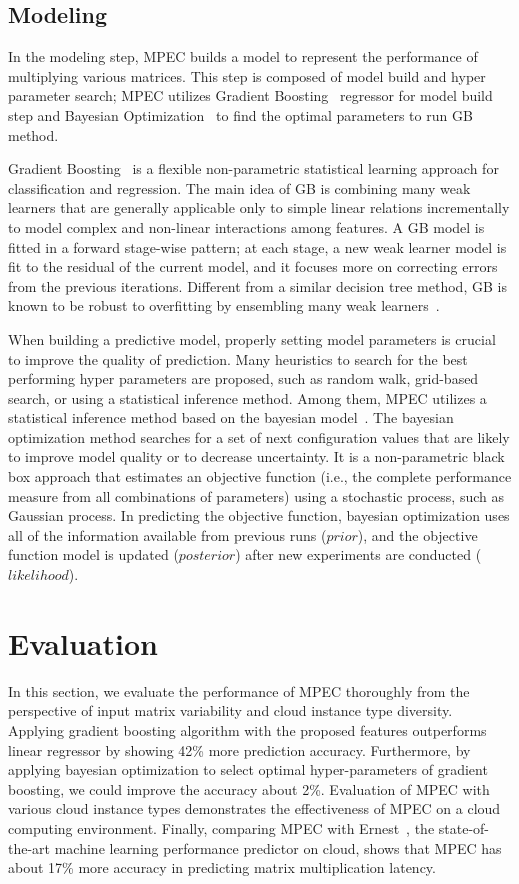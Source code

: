 \documentclass[10pt, conference, compsocconf]{IEEEtran}
\begin{document}
\subsection{Modeling}\label{sec:modeling}
In the modeling step, MPEC builds a model to represent the performance of multiplying various matrices. This step is composed of model build and hyper parameter search; MPEC utilizes Gradient Boosting~\cite{gradient-boosting} regressor for model build step and Bayesian Optimization~\cite{bayesian-optimization} to find the optimal parameters to run GB method.

Gradient Boosting~\cite{gradient-boosting} is a flexible non-parametric statistical learning approach for classification and regression. The main idea of GB is combining many weak learners that are generally applicable only to simple linear relations incrementally to model complex and non-linear interactions among features. A GB model is fitted in a forward stage-wise pattern; at each stage, a new weak learner model is fit to the residual of the current model, and it focuses more on correcting errors from the previous iterations. Different from a similar decision tree method, GB is known to be robust to overfitting by ensembling many weak learners~\cite{random-forest}.

When building a predictive model, properly setting model parameters is crucial to improve the quality of prediction. Many heuristics to search for the best performing hyper parameters are proposed, such as random walk, grid-based search, or using a statistical inference method. Among them, MPEC utilizes a statistical inference method based on the bayesian model~\cite{bayesian-optimization}. The bayesian optimization method searches for a set of next configuration values that are likely to improve model quality or to decrease uncertainty. It is a non-parametric black box approach that estimates an objective function (i.e., the complete performance measure from all combinations of parameters) using a stochastic process, such as Gaussian process. In predicting the objective function, bayesian optimization uses all of the information available from previous runs ($prior$), and the objective function model is updated ($posterior$) after new experiments are conducted ($likelihood$). 

\section{Evaluation}{\label{sec:eval}}
In this section, we evaluate the performance of MPEC thoroughly from the perspective of input matrix variability and cloud instance type diversity. Applying gradient boosting algorithm with the proposed features outperforms linear regressor by showing 42\% more prediction accuracy. Furthermore, by applying bayesian optimization to select optimal hyper-parameters of gradient boosting, we could improve the accuracy about 2\%. Evaluation of MPEC with various cloud instance types demonstrates the effectiveness of MPEC on a cloud computing environment. Finally, comparing MPEC with Ernest~\cite{ernest}, the state-of-the-art machine learning performance predictor on cloud, shows that MPEC has about 17\% more accuracy in predicting matrix multiplication latency.
\end{document}
